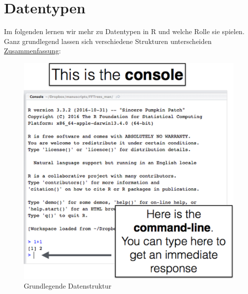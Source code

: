 \documentclass[
]{article}
\begin{document}
\hypertarget{datentypen}{%
\section{Datentypen}\label{datentypen}}

Im folgenden lernen wir mehr zu Datentypen in R und welche Rolle sie spielen. Ganz grundlegend lassen sich verschiedene Strukturen unterscheiden \href{https://statsandr.com/blog/variable-types-and-examples/}{Zusammenfassung}:

\begin{figure}

{\centering \includegraphics[width=0.8\linewidth]{images/013} 

}

\caption{Grundlegende Datenstruktur}\label{fig:unnamed-chunk-37}
\end{figure}
\end{document}

